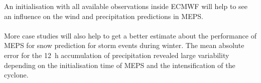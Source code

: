An initialisation with all available observations inside ECMWF will help to see an influence on the wind and precipitation predictions in MEPS.
\\
\\
More case studies will also help to get a better estimate about the performance of MEPS for snow prediction for storm events during winter. The mean absolute error for the \SI{12}{\hour} accumulation of precipitation revealed large variability depending on the initialisation time of MEPS and the intensification of the cyclone.
